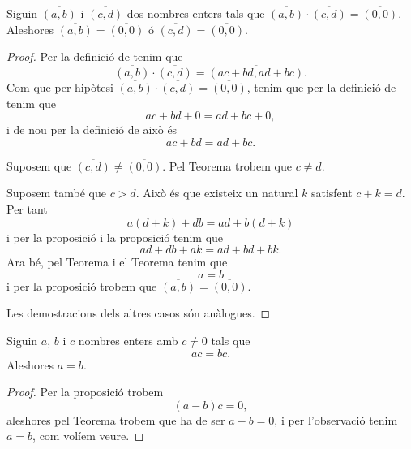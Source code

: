 \documentclass[../Apunts.tex]{subfiles}
\begin{document}
	\begin{theorem}
		\label{thm:Z és un DI}
		Siguin \(\overline{(a,b)}\) i \(\overline{(c,d)}\) dos nombres enters tals que \(\overline{(a,b)}\cdot\overline{(c,d)}=\overline{(0,0)}\). Aleshores \(\overline{(a,b)}=\overline{(0,0)}\) ó \(\overline{(c,d)}=\overline{(0,0)}\).
		\begin{proof}
			Per la definició de  tenim que
			\[\overline{(a,b)}\cdot\overline{(c,d)}=\overline{(ac+bd,ad+bc)}.\]
			Com que per hipòtesi \(\overline{(a,b)}\cdot\overline{(c,d)}=\overline{(0,0)}\), tenim que per la definició de  tenim que
			\[ac+bd+0=ad+bc+0,\]
			i de nou per la definició de  això és
			\[ac+bd=ad+bc.\]
			
			Suposem que \(\overline{(c,d)}\neq\overline{(0,0)}\). Pel Teorema  trobem que \(c\neq d\).
			
			Suposem també que \(c>d\). Això és que existeix un natural \(k\) satisfent \(c+k=d\). Per tant %
			\[a(d+k)+db=ad+b(d+k)\]
			i per la proposició  i la proposició  tenim que
			\[ad+db+ak=ad+bd+bk.\]
			Ara bé, pel Teorema  i el Teorema  tenim que
			\[a=b\]
			i per la proposició  trobem que \(\overline{(a,b)}=\overline{(0,0)}\).
			
			Les demostracions dels altres casos són anàlogues.
		\end{proof}
	\end{theorem}
	\begin{corollary}
		\label{corollary:podem tatxar pels costats en Z pel producte}
		Siguin \(a\), \(b\) i \(c\) nombres enters amb \(c\neq0\) tals que
		\[ac=bc.\]
		Aleshores \(a=b\).
		\begin{proof}
			Per la proposició  trobem
			\[(a-b)c=0,\]
			aleshores pel Teorema  trobem que ha de ser \(a-b=0\), i per l'observació  tenim \(a=b\), com volíem veure.
		\end{proof}
	\end{corollary}
\end{document}
